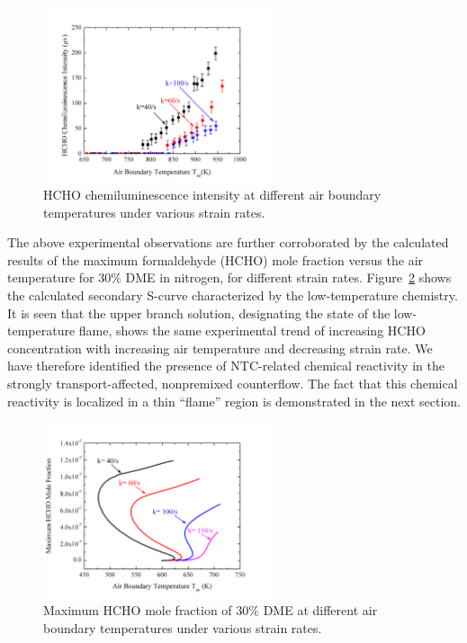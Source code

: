 \documentclass[review,3p,times]{elsarticleUS}
\begin{document}
\begin{figure}[t]
  \centering
  \scriptsize
  \vspace{-0.1in}
  \includegraphics[width=0.6\textwidth]{PMT.png}
  \normalsize
  \vspace{-0.1in}
  \caption{HCHO chemiluminescence intensity at different air boundary temperatures under various strain rates.}
  \label{fig:PMT}
\end{figure}

The above experimental observations are further corroborated by the calculated results of the maximum formaldehyde (HCHO) mole fraction versus the air temperature for $30\%$ DME in nitrogen, for different strain rates.  Figure~\ref{fig:Scurve-SR} shows the calculated secondary S-curve characterized by the low-temperature chemistry.  It is seen that the upper branch solution, designating the state of the low-temperature flame, shows the same experimental trend of increasing HCHO concentration with increasing air temperature and decreasing strain rate.  We have therefore identified the presence of NTC-related chemical reactivity in the strongly transport-affected, nonpremixed counterflow.  The fact that this chemical reactivity is localized in a thin “flame” region is demonstrated in the next section.

\begin{figure}[t]
  \centering
  \scriptsize
  \vspace{-0.1in}
  \includegraphics[width=0.6\textwidth]{Scurve-SR.png}
  \normalsize
  \vspace{-0.1in}
  \caption{Maximum HCHO mole fraction of $30\%$ DME at different air boundary temperatures under various strain rates.}
  \label{fig:Scurve-SR}
\end{figure}
\end{document}
